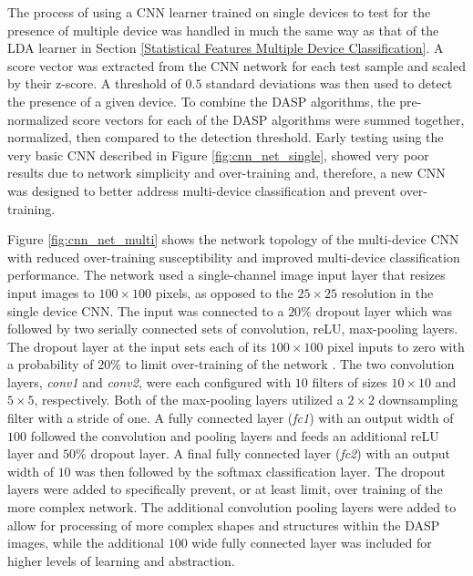 The process of using a CNN learner trained on single devices to test for the presence of multiple device was handled in much the same way as that of the LDA learner in Section \ref{Statistical Features Multiple Device Classification}.  A score vector was extracted from the CNN network for each test sample and scaled by their z-score.  A threshold of $0.5$ standard deviations was then used to detect the presence of a given device.  To combine the DASP algorithms, the pre-normalized score vectors for each of the DASP algorithms were summed together, normalized, then compared to the detection threshold.  Early testing using the very basic CNN described in Figure \ref{fig:cnn_net_single}, showed very poor results due to network simplicity and over-training and, therefore, a new CNN was designed to better address multi-device classification and prevent over-training.

Figure \ref{fig:cnn_net_multi} shows the network topology of the multi-device CNN with reduced over-training susceptibility and improved multi-device classification performance.  The network used a single-channel image input layer that resizes input images to $100 \times 100$ pixels, as opposed to the $25 \times 25$ resolution in the single device CNN.  The input was connected to a $20\%$ dropout layer which was followed by two serially connected sets of convolution, reLU, max-pooling layers.  The dropout layer at the input sets each of its $100 \times 100$ pixel inputs to zero with a probability of $20\%$ to limit over-training of the network \cite{Srivastava2014}.  The two convolution layers, \textit{conv1} and \textit{conv2}, were each configured with $10$ filters of sizes $10 \times 10$ and $5 \times 5$, respectively. Both of the max-pooling layers utilized a $2 \times 2$ downsampling filter with a stride of one.  A fully connected layer (\textit{fc1}) with an output width of $100$ followed the convolution and pooling layers and feeds an additional reLU layer and $50\%$ dropout layer.  A final fully connected layer (\textit{fc2}) with an output width of $10$ was then followed by the softmax classification layer.  The dropout layers were added to specifically prevent, or at least limit, over training of the more complex network.  The additional convolution pooling layers were added to allow for processing of more complex shapes and structures within the DASP images, while the additional $100$ wide fully connected layer was included for higher levels of learning and abstraction.

